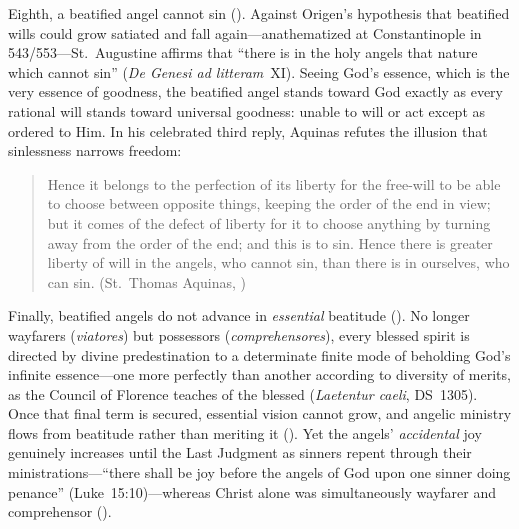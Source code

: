 Eighth, a beatified angel cannot sin (). Against Origen's hypothesis that beatified wills could grow satiated and fall again---anathematized at Constantinople in 543/553---St.~Augustine affirms that ``there is in the holy angels that nature which cannot sin'' (\emph{De Genesi ad litteram}~XI). Seeing God's essence, which is the very essence of goodness, the beatified angel stands toward God exactly as every rational will stands toward universal goodness: unable to will or act except as ordered to Him. In his celebrated third reply, Aquinas refutes the illusion that sinlessness narrows freedom:
\begin{quotation}
Hence it belongs to the perfection of its liberty for the free-will to be able to choose between opposite things, keeping the order of the end in view; but it comes of the defect of liberty for it to choose anything by turning away from the order of the end; and this is to sin. Hence there is greater liberty of will in the angels, who cannot sin, than there is in ourselves, who can sin. (St.~Thomas Aquinas, )
\end{quotation}

Finally, beatified angels do not advance in \emph{essential} beatitude (). No longer wayfarers (\emph{viatores}) but possessors (\emph{comprehensores}), every blessed spirit is directed by divine predestination to a determinate finite mode of beholding God's infinite essence---one more perfectly than another according to diversity of merits, as the Council of Florence teaches of the blessed (\emph{Laetentur caeli}, DS~1305). Once that final term is secured, essential vision cannot grow, and angelic ministry flows from beatitude rather than meriting it (). Yet the angels' \emph{accidental} joy genuinely increases until the Last Judgment as sinners repent through their ministrations---``there shall be joy before the angels of God upon one sinner doing penance'' (Luke~15:10)---whereas Christ alone was simultaneously wayfarer and comprehensor ().

